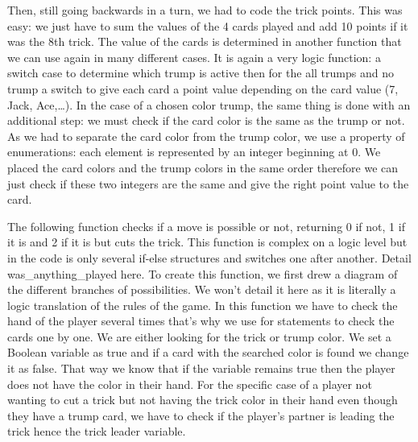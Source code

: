 \documentclass[12pt]{article}
\begin{document}
Then, still going backwards in a turn, we had to code the trick points. This was easy: we just have to sum the values of the 4 cards played and add 10 points if it was the 8th trick. The value of the cards is determined in another function that we can use again in many different cases. It is again a very logic function: a switch case to determine which trump is active then for the all trumps and no trump a switch to give each card a point value depending on the card value (7, Jack, Ace,…). In the case of a chosen color trump, the same thing is done with an additional step: we must check if the card color is the same as the trump or not. As we had to separate the card color from the trump color, we use a property of enumerations: each element is represented by an integer beginning at 0. We placed the card colors and the trump colors in the same order therefore we can just check if these two integers are the same and give the right point value to the card.

The following function checks if a move is possible or not, returning 0 if not, 1 if it is and 2 if it is but cuts the trick. This function is complex on a logic level but in the code is only several if-else structures and switches one after another. Detail was\_anything\_played here. To create this function, we first drew a diagram of the different branches of possibilities. We won’t detail it here as it is literally a logic translation of the rules of the game. In this function we have to check the hand of the player several times that’s why we use for statements to check the cards one by one. We are either looking for the trick or trump color. We set a Boolean variable as true and if a card with the searched color is found we change it as false. That way we know that if the variable remains true then the player does not have the color in their hand. For the specific case of a player not wanting to cut a trick but not having the trick color in their hand even though they have a trump card, we have to check if the player’s partner is leading the trick hence the trick leader variable.
\end{document}

